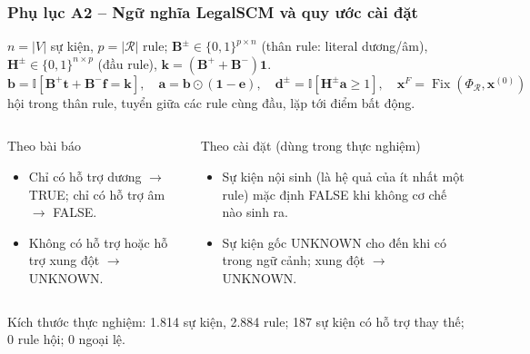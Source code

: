\begin{frame}
\frametitle{Phụ lục A2 -- Ngữ nghĩa LegalSCM và quy ước cài đặt}
\footnotesize
$n=|V|$ sự kiện, $p=|\mathcal R|$ rule;\quad
$\mathbf B^{\pm}\in\{0,1\}^{p\times n}$ (thân rule: literal dương/âm),\quad
$\mathbf H^{\pm}\in\{0,1\}^{n\times p}$ (đầu rule),\quad
$\mathbf k=(\mathbf B^{+}+\mathbf B^{-})\mathbf 1$.
\[
\mathbf b=\mathbb I[\mathbf B^{+}\mathbf t+\mathbf B^{-}\mathbf f=\mathbf k],\quad
\mathbf a=\mathbf b\odot(\mathbf 1-\mathbf e),\quad
\mathbf d^{\pm}=\mathbb I[\mathbf H^{\pm}\mathbf a\ge1],\quad
\mathbf x^{F}=\operatorname{Fix}(\Phi_{\mathcal R},\mathbf x^{(0)})
\]
\dien hội trong thân rule, tuyển giữa các rule cùng đầu, lặp tới điểm bất động.

\vspace{0.1cm}
\begin{columns}[T,onlytextwidth]
\begin{block}{Theo bài báo}
\footnotesize
\begin{itemize}
  \item Chỉ có hỗ trợ dương $\rightarrow$ TRUE; chỉ có hỗ trợ âm $\rightarrow$ FALSE.
  \item Không có hỗ trợ hoặc hỗ trợ xung đột $\rightarrow$ UNKNOWN.
\end{itemize}
\end{block}
\begin{block}{Theo cài đặt (dùng trong thực nghiệm)}
\footnotesize
\begin{itemize}
  \item Sự kiện nội sinh (là hệ quả của ít nhất một rule) mặc định FALSE khi không cơ chế nào sinh ra.
  \item Sự kiện gốc UNKNOWN cho đến khi có trong ngữ cảnh; xung đột $\rightarrow$ UNKNOWN.
\end{itemize}
\end{block}
\end{columns}

\vspace{0.12cm}
Kích thước thực nghiệm: 1.814 sự kiện, 2.884 rule; 187 sự kiện có hỗ trợ thay thế; 0 rule hội; 0 ngoại lệ.
\end{frame}

